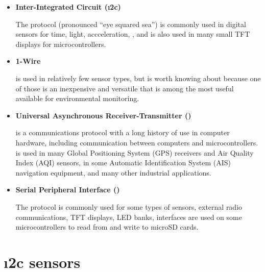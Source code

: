 \begin{itemize}
	\item \textbf{Inter-Integrated Circuit (\i2c)}

	The  protocol (pronounced ``eye squared sea'') is commonly used in digital sensors for time, light, accceleration, \etc, and is also used in many small TFT displays for microcontrollers.

	\item \textbf{1-Wire}

	  is used in relatively few sensor types, but is worth knowing about because one of those is an inexpensive and versatile  that is among the most useful available for environmental monitoring.


	\item \textbf{Universal Asynchronous Receiver-Transmitter (\uart)}

	 is a communications protocol with a long history of use in computer hardware, including communication between computers and microcontrollers.
	\uart is used in many Global Positioning System (GPS) receivers and Air Quality Index (AQI) sensors, in some Automatic Identification System (AIS) navigation equipment, and many other industrial applications.

	\item \textbf{Serial Peripheral Interface (\spi)}

	The  protocol is commonly used for some types of sensors, external radio communications, TFT displays, LED banks, \etc \spi interfaces are used on some microcontrollers to read from and write to microSD cards.
\end{itemize}



\section{ \i2c sensors }
